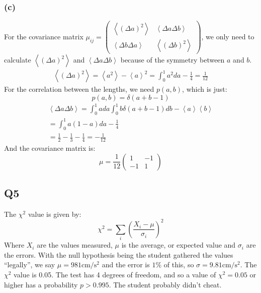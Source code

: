 \documentclass[../main.tex]{subfiles}
\begin{document}
\subsubsection*{(c)}
For the covariance matrix $\mu_{ij} = \left(\begin{matrix}\left<(\Delta a)^2\right> & \left<\Delta a\Delta b\right> \\ \left<\Delta b\Delta a\right> & \left<(\Delta b)^2\right>\end{matrix}\right)$, we only need to calculate $\left<(\Delta a)^2\right>$ and $\left<\Delta a\Delta b\right>$ because of the symmetry between $a$ and $b$. 
\begin{align*}
	\left<(\Delta a)^2\right> = \left<a^2\right> - \left<a\right>^2 = \int_0^1a^2da - \frac{1}{4} = \frac{1}{12}
\end{align*}
For the correlation between the lengths, we need $p(a, b)$, which is just:
\begin{equation}
	p(a, b) = \delta(a+b-1)
\end{equation}
\begin{align*}
	\left<\Delta a\Delta b\right> = \int_0^1ada\int_0^1b\delta(a+b-1)db - \left<a\right>\left<b\right> \\
	= \int_0^1a (1-a)da - \frac{1}{4} \\
	= \frac{1}{2}-\frac{1}{3}-\frac{1}{4} = -\frac{1}{12}
\end{align*}
And the covariance matrix is:
\begin{equation}
	\mu = \frac{1}{12}\left(\begin{matrix}1 & -1 \\ -1 & 1\end{matrix}\right)
\end{equation}
\subsection{Q5}
The $\chi^2$ value is given by:
\begin{equation}
	\chi^2 = \sum_i \left(\frac{X_i-\mu}{\sigma_i}\right)^2
\end{equation}
Where $X_i$ are the values measured, $\mu$ is the average, or expected value and $\sigma_i$ are the errors.
With the null hypothesis being the student gathered the values ``legally'', we say $\mu=981\text{cm/s$^2$}$ and the error is $1\%$ of this, so $\sigma=9.81\text{cm/s$^2$}$. The $\chi^2$ value is 0.05. The test has 4 degrees of freedom, and so a value of $\chi^2=0.05$ or higher has a probability $p>0.995$. The student probably didn't cheat.
\end{document}
